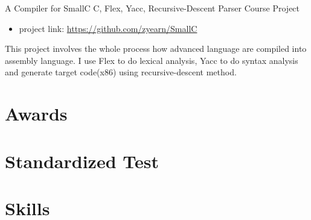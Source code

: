 \documentclass[11pt,a4paper]{moderncv}
\begin{document}
{A Compiler for SmallC}
{C, Flex, Yacc, Recursive-Descent Parser}
{Course Project}
{}
{
\begin{itemize}
    \item project link: \url{https://github.com/zyearn/SmallC}
\end{itemize}
This project involves the whole process how advanced language are compiled into assembly language.
I use Flex to do lexical analysis, Yacc to do syntax analysis and generate target code(x86) using recursive-descent method.
}




\section{Awards}

\section{Standardized Test}


\section{Skills}
\end{document}
